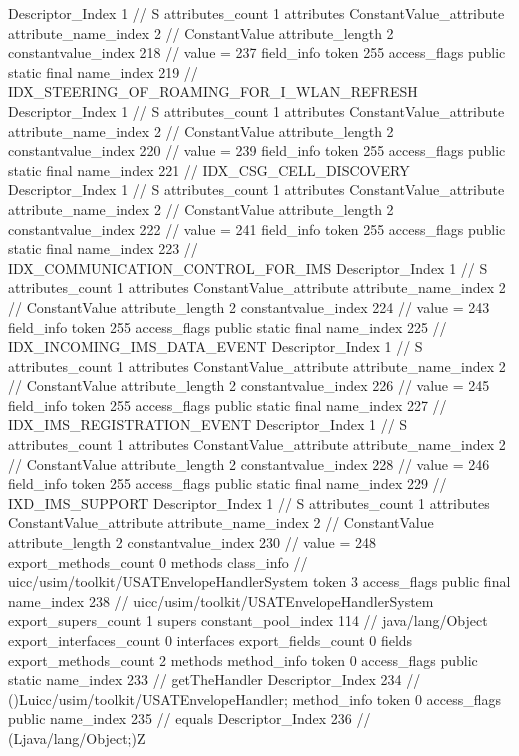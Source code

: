 {{{{{				Descriptor_Index	1		// S
				attributes_count	1
				attributes {
				ConstantValue_attribute {
					attribute_name_index	2		// ConstantValue
					attribute_length	2
					constantvalue_index	218		// value = 237
				}
				}
			}
			field_info {
				token	255
				access_flags	public static final
				name_index	219		// IDX_STEERING_OF_ROAMING_FOR_I_WLAN_REFRESH
				Descriptor_Index	1		// S
				attributes_count	1
				attributes {
				ConstantValue_attribute {
					attribute_name_index	2		// ConstantValue
					attribute_length	2
					constantvalue_index	220		// value = 239
				}
				}
			}
			field_info {
				token	255
				access_flags	public static final
				name_index	221		// IDX_CSG_CELL_DISCOVERY
				Descriptor_Index	1		// S
				attributes_count	1
				attributes {
				ConstantValue_attribute {
					attribute_name_index	2		// ConstantValue
					attribute_length	2
					constantvalue_index	222		// value = 241
				}
				}
			}
			field_info {
				token	255
				access_flags	public static final
				name_index	223		// IDX_COMMUNICATION_CONTROL_FOR_IMS
				Descriptor_Index	1		// S
				attributes_count	1
				attributes {
				ConstantValue_attribute {
					attribute_name_index	2		// ConstantValue
					attribute_length	2
					constantvalue_index	224		// value = 243
				}
				}
			}
			field_info {
				token	255
				access_flags	public static final
				name_index	225		// IDX_INCOMING_IMS_DATA_EVENT
				Descriptor_Index	1		// S
				attributes_count	1
				attributes {
				ConstantValue_attribute {
					attribute_name_index	2		// ConstantValue
					attribute_length	2
					constantvalue_index	226		// value = 245
				}
				}
			}
			field_info {
				token	255
				access_flags	public static final
				name_index	227		// IDX_IMS_REGISTRATION_EVENT
				Descriptor_Index	1		// S
				attributes_count	1
				attributes {
				ConstantValue_attribute {
					attribute_name_index	2		// ConstantValue
					attribute_length	2
					constantvalue_index	228		// value = 246
				}
				}
			}
			field_info {
				token	255
				access_flags	public static final
				name_index	229		// IXD_IMS_SUPPORT
				Descriptor_Index	1		// S
				attributes_count	1
				attributes {
				ConstantValue_attribute {
					attribute_name_index	2		// ConstantValue
					attribute_length	2
					constantvalue_index	230		// value = 248
				}
				}
			}
			}
			export_methods_count	0
			methods {
			}
		}
		class_info {		// uicc/usim/toolkit/USATEnvelopeHandlerSystem
			token	3
			access_flags	public final
			name_index	238		// uicc/usim/toolkit/USATEnvelopeHandlerSystem
			export_supers_count	1
			supers {
				constant_pool_index	114		// java/lang/Object
			}
			export_interfaces_count	0
			interfaces {
			}
			export_fields_count	0
			fields {
			}
			export_methods_count	2
			methods {
				method_info {
					token	0
					access_flags	public static
					name_index	233		// getTheHandler
					Descriptor_Index	234		// ()Luicc/usim/toolkit/USATEnvelopeHandler;
				}
				method_info {
					token	0
					access_flags	public
					name_index	235		// equals
					Descriptor_Index	236		// (Ljava/lang/Object;)Z
				}
			}
		}
	}
}
